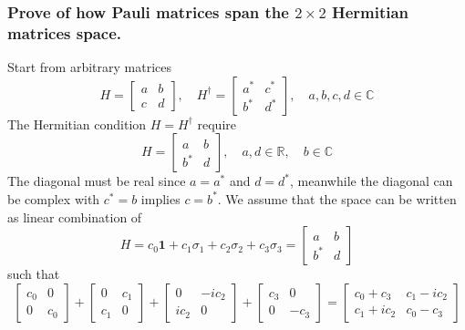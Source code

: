 \documentclass[../../../main.tex]{subfiles}
\begin{document}
\subsubsection{Prove of how Pauli matrices span the $2 \times 2$ Hermitian matrices space.}
Start from arbitrary matrices
\begin{equation*}
    H = \begin{bmatrix}
        a & b \\
        c & d
    \end{bmatrix},
    \quad
    H ^\dagger = \begin{bmatrix}
        a ^* & c ^* \\
        b ^* & d ^*
    \end{bmatrix},
    \quad a, b, c, d \in \mathbb{C}
\end{equation*}
The Hermitian condition $H = H ^\dagger$ require
\begin{equation*}
    H = \begin{bmatrix}
        a   & b \\
        b^* & d
    \end{bmatrix}, \quad a, d \in \mathbb{R}, \quad b \in \mathbb{C}
\end{equation*}
The diagonal must be real since $a = a ^*$ and $d = d ^*$, meanwhile the diagonal can be complex with $c ^* = b$ implies $c  = b ^*$.
We assume that the space can be written as linear combination of
\begin{equation*}
    H =c_0 \mathbf{1 } + c_1 \sigma_1 + c_2 \sigma_2 + c_3 \sigma_3 =\begin{bmatrix}
        a   & b \\
        b^* & d
    \end{bmatrix}
\end{equation*}
such that
\begin{equation*}
    \begin{bmatrix}
        c_0 & 0   \\
        0   & c_0
    \end{bmatrix}
    +
    \begin{bmatrix}
        0   & c_1 \\
        c_1 & 0
    \end{bmatrix}
    +
    \begin{bmatrix}
        0    & -ic_2 \\
        ic_2 & 0
    \end{bmatrix}
    +
    \begin{bmatrix}
        c_3 & 0    \\
        0   & -c_3
    \end{bmatrix}
    =
    \begin{bmatrix}
        c_0 + c_3  & c_1 - ic_2 \\
        c_1 + ic_2 & c_0 - c_3
    \end{bmatrix}
\end{equation*}
\end{document}
